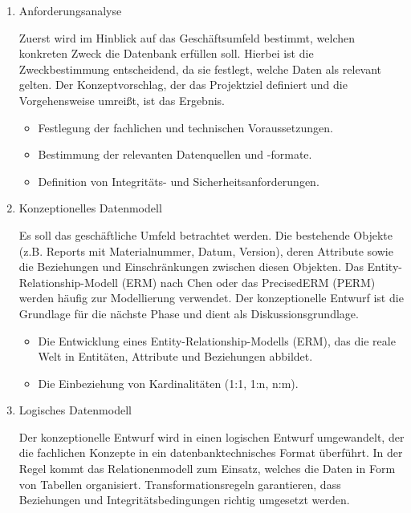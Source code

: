 \begin{enumerate}

\item
Anforderungsanalyse

Zuerst wird im Hinblick auf das Geschäftsumfeld bestimmt, welchen konkreten Zweck die Datenbank erfüllen soll.
Hierbei ist die Zweckbestimmung  entscheidend, da sie festlegt, welche Daten als relevant gelten.
Der Konzeptvorschlag, der das Projektziel definiert und die Vorgehensweise umreißt, ist das Ergebnis.
\begin{itemize}

\item
Festlegung der fachlichen und technischen Voraussetzungen.
\item
Bestimmung der relevanten Datenquellen und -formate.
\item
Definition von Integritäts- und Sicherheitsanforderungen.

\end{itemize}

\item
Konzeptionelles Datenmodell

Es soll das geschäftliche Umfeld betrachtet werden.
Die bestehende Objekte (z.B. Reports mit Materialnummer, Datum, Version), deren Attribute sowie die Beziehungen und Einschränkungen zwischen diesen Objekten.
Das Entity-Relationship-Modell (ERM) nach Chen oder das PrecisedERM (PERM) werden häufig zur Modellierung verwendet.
Der konzeptionelle Entwurf ist die Grundlage für die nächste Phase und dient als Diskussionsgrundlage.
\begin{itemize}

\item Die Entwicklung eines Entity-Relationship-Modells (ERM), das die reale Welt in Entitäten, Attribute und Beziehungen abbildet.
\item Die Einbeziehung von Kardinalitäten (1:1, 1:n, n:m).

\end{itemize}

\item
Logisches Datenmodell

Der konzeptionelle Entwurf wird in einen logischen Entwurf umgewandelt, der die fachlichen Konzepte in ein datenbanktechnisches Format überführt.
In der Regel kommt das Relationenmodell zum Einsatz, welches die Daten in Form von Tabellen organisiert.
Transformationsregeln garantieren, dass Beziehungen und Integritätsbedingungen richtig umgesetzt werden.
\begin{itemize}


\end{itemize}
\end{enumerate}
